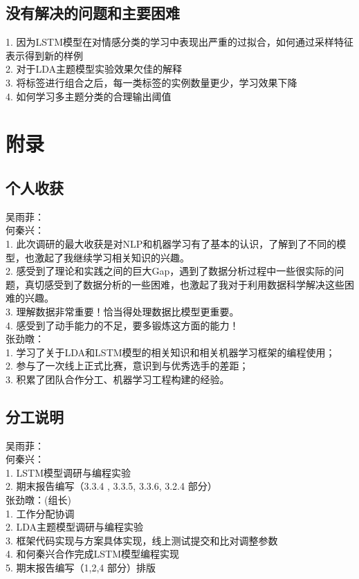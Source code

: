 \documentclass[a4paper]{article}
\begin{document}
   	\subsection{没有解决的问题和主要困难}
	\noindent
 	\large
 	1. 因为LSTM模型在对情感分类的学习中表现出严重的过拟合，如何通过采样特征表示得到新的样例 \\
 	2. 对于LDA主题模型实验效果欠佳的解释 \\
 	3. 将标签进行组合之后，每一类标签的实例数量更少，学习效果下降 \\
 	4. 如何学习多主题分类的合理输出阈值 

   \section{附录}
    \subsection{个人收获}
    \noindent
    吴雨菲：\\
    何秦兴：\\
    1. 此次调研的最大收获是对NLP和机器学习有了基本的认识，了解到了不同的模型，也激起了我继续学习相关知识的兴趣。  \\
	2. 感受到了理论和实践之间的巨大Gap，遇到了数据分析过程中一些很实际的问题，真切感受到了数据分析的一些困难，也激起了我对于利用数据科学解决这些困难的兴趣。\\
	3. 理解数据非常重要！恰当得处理数据比模型更重要。\\
	4. 感受到了动手能力的不足，要多锻炼这方面的能力！\\[10pt]
    张劲暾：\\
    1. 学习了关于LDA和LSTM模型的相关知识和相关机器学习框架的编程使用； \\
    2. 参与了一次线上正式比赛，意识到与优秀选手的差距；\\
    3. 积累了团队合作分工、机器学习工程构建的经验。
   	\subsection{分工说明}
   	\noindent
 	吴雨菲：\\
    何秦兴：\\
    1. LSTM模型调研与编程实验\\
    2. 期末报告编写（3.3.4 , 3.3.5, 3.3.6, 3.2.4 部分）\\[10pt]
    张劲暾：(组长)\\
    1. 工作分配协调\\
    2. LDA主题模型调研与编程实验 \\
    3. 框架代码实现与方案具体实现，线上测试提交和比对调整参数 \\
    4. 和何秦兴合作完成LSTM模型编程实现 \\
    5. 期末报告编写（1,2,4 部分）排版 \\
\end{document}
